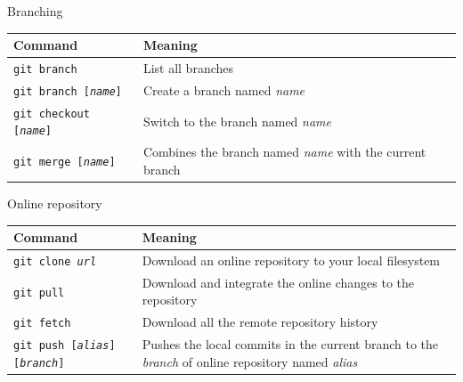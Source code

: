 \documentclass{beamer}
\begin{document}
\begin{frame}{Branching}
\begin{table}
    \scriptsize
    \centering
    \begin{tabular}{p{}p{}}
        \toprule
        \alert{Command}	&	\alert{Meaning}\\
        \midrule
        \texttt{git branch}	&	List all branches\\
        \texttt{git branch [\textit{name}]}	&	Create a branch named \textit{name}\\
        \texttt{git checkout [\textit{name}]}	&	Switch to the branch named \textit{name}\\
        \texttt{git merge [\textit{name}]}	&	Combines the branch named \textit{name} with the current branch\\
        \bottomrule
        \end{tabular}
    \end{table}
\end{frame}

\begin{frame}{Online repository}
\begin{table}
    \scriptsize
    \centering
    \begin{tabular}{p{}p{}}
        \toprule
        \alert{Command}	&	\alert{Meaning}\\
        \midrule
        \texttt{git clone \textit{url}}	&	Download an online repository to your local filesystem\\
        \texttt{git pull}	&	Download and integrate the online changes to the repository\\
        \texttt{git fetch}	&	Download all the remote repository history\\
        \texttt{git push [\textit{alias}] [\textit{branch}]}	& Pushes the local commits in the current branch to the \textit{branch} of online repository named \textit{alias}\\
        \bottomrule
        \end{tabular}
\end{table}
\end{frame}
\end{document}
